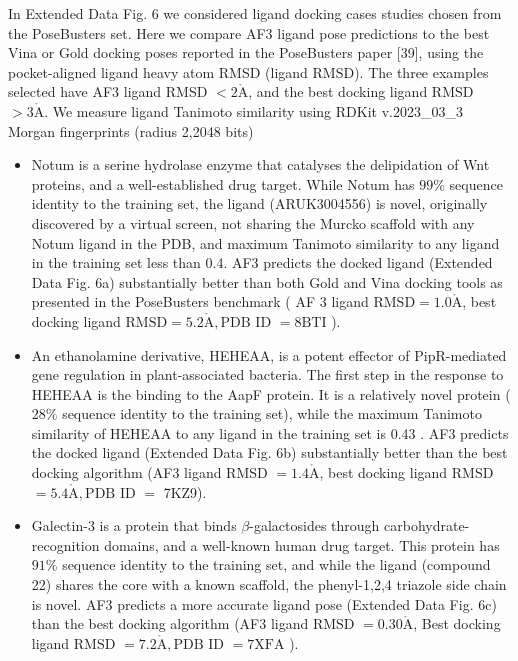 \documentclass[10pt]{article}
\def\AA{\mathring{\mathrm{A}}}
\begin{document}
In Extended Data Fig. 6 we considered ligand docking cases studies chosen from the PoseBusters set. Here we compare AF3 ligand pose predictions to the best Vina or Gold docking poses reported in the PoseBusters paper [39], using the pocket-aligned ligand heavy atom RMSD (ligand RMSD). The three examples selected have AF3 ligand RMSD $<2 \AA$, and the best docking ligand RMSD $>3 \AA$. We measure ligand Tanimoto similarity using RDKit v.2023\_03\_3 Morgan fingerprints (radius 2,2048 bits)

\begin{itemize}
  \item Notum is a serine hydrolase enzyme that catalyses the delipidation of Wnt proteins, and a well-established drug target. While Notum has $99 \%$ sequence identity to the training set, the ligand (ARUK3004556) is novel, originally\\
discovered by a virtual screen, not sharing the Murcko scaffold with any Notum ligand in the PDB, and maximum Tanimoto similarity to any ligand in the training set less than 0.4. AF3 predicts the docked ligand (Extended Data Fig. 6a) substantially better than both Gold and Vina docking tools as presented in the PoseBusters benchmark ( AF 3 ligand $\mathrm{RMSD}=1.0 \AA$, best docking ligand $\mathrm{RMSD}=5.2 \AA, \mathrm{PDB}$ ID $=8 \mathrm{BTI}$ ).
  \item An ethanolamine derivative, HEHEAA, is a potent effector of PipR-mediated gene regulation in plant-associated bacteria. The first step in the response to HEHEAA is the binding to the AapF protein. It is a relatively novel protein ( $28 \%$ sequence identity to the training set), while the maximum Tanimoto similarity of HEHEAA to any ligand in the training set is 0.43 . AF3 predicts the docked ligand (Extended Data Fig. 6b) substantially better than the best docking algorithm (AF3 ligand RMSD $=1.4 \AA$, best docking ligand RMSD $=5.4 \AA, \mathrm{PDB}$ ID $=$ 7KZ9).
  \item Galectin-3 is a protein that binds $\beta$-galactosides through carbohydrate-recognition domains, and a well-known human drug target. This protein has $91 \%$ sequence identity to the training set, and while the ligand (compound 22) shares the core with a known scaffold, the phenyl-1,2,4 triazole side chain is novel. AF3 predicts a more accurate ligand pose (Extended Data Fig. 6c) than the best docking algorithm (AF3 ligand RMSD $=0.30 \AA$, Best docking ligand RMSD $=7.2 \AA, \mathrm{PDB}$ ID $=7 \mathrm{XFA}$ ).
\end{itemize}
\end{document}
